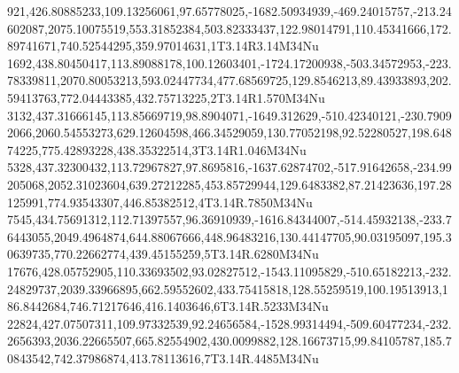 921,426.80885233,109.13256061,97.65778025,-1682.50934939,-469.24015757,-213.24602087,2075.10075519,553.31852384,503.82333437,122.98014791,110.45341666,172.89741671,740.52544295,359.97014631,1T3.14R3.14M34Nu
1692,438.80450417,113.89088178,100.12603401,-1724.17200938,-503.34572953,-223.78339811,2070.80053213,593.02447734,477.68569725,129.8546213,89.43933893,202.59413763,772.04443385,432.75713225,2T3.14R1.570M34Nu
3132,437.31666145,113.85669719,98.8904071,-1649.312629,-510.42340121,-230.79092066,2060.54553273,629.12604598,466.34529059,130.77052198,92.52280527,198.64874225,775.42893228,438.35322514,3T3.14R1.046M34Nu
5328,437.32300432,113.72967827,97.8695816,-1637.62874702,-517.91642658,-234.99205068,2052.31023604,639.27212285,453.85729944,129.6483382,87.21423636,197.28125991,774.93543307,446.85382512,4T3.14R.7850M34Nu
7545,434.75691312,112.71397557,96.36910939,-1616.84344007,-514.45932138,-233.76443055,2049.4964874,644.88067666,448.96483216,130.44147705,90.03195097,195.30639735,770.22662774,439.45155259,5T3.14R.6280M34Nu
17676,428.05752905,110.33693502,93.02827512,-1543.11095829,-510.65182213,-232.24829737,2039.33966895,662.59552602,433.75415818,128.55259519,100.19513913,186.8442684,746.71217646,416.1403646,6T3.14R.5233M34Nu
22824,427.07507311,109.97332539,92.24656584,-1528.99314494,-509.60477234,-232.2656393,2036.22665507,665.82554902,430.0099882,128.16673715,99.84105787,185.70843542,742.37986874,413.78113616,7T3.14R.4485M34Nu
